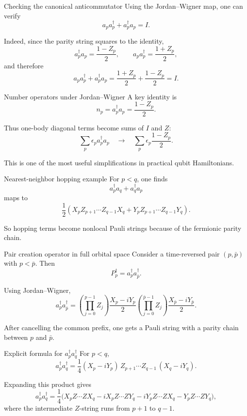 \documentclass[aspectratio=169]{beamer}
\begin{document}
\begin{frame}{Checking the canonical anticommutator}
Using the Jordan--Wigner map, one can verify
\[
a_p a_p^\dagger + a_p^\dagger a_p = I.
\]

Indeed, since the parity string squares to the identity,
\[
a_p^\dagger a_p
=
\frac{1-Z_p}{2},
\qquad
a_p a_p^\dagger
=
\frac{1+Z_p}{2},
\]
and therefore
\[
a_p a_p^\dagger + a_p^\dagger a_p
=
\frac{1+Z_p}{2}+\frac{1-Z_p}{2}=I.
\]
\end{frame}

\begin{frame}{Number operators under Jordan--Wigner}
A key identity is
\[
n_p = a_p^\dagger a_p = \frac{1-Z_p}{2}.
\]

Thus one-body diagonal terms become sums of \(I\) and \(Z\):
\[
\sum_p \epsilon_p a_p^\dagger a_p
\quad \longrightarrow \quad
\sum_p \epsilon_p \frac{1-Z_p}{2}.
\]

This is one of the most useful simplifications in practical qubit Hamiltonians.
\end{frame}

\begin{frame}{Nearest-neighbor hopping example}
For \(p<q\), one finds
\[
a_p^\dagger a_q + a_q^\dagger a_p
\]
maps to
\[
\frac12
\left(
X_p Z_{p+1}\cdots Z_{q-1} X_q
+
Y_p Z_{p+1}\cdots Z_{q-1} Y_q
\right).
\]

So hopping terms become nonlocal Pauli strings because of the fermionic parity chain.
\end{frame}

\begin{frame}{Pair creation operator in full orbital space}
Consider a time-reversed pair \((p,\bar p)\) with \(p<\bar p\).
Then
\[
P_p^\dagger = a_p^\dagger a_{\bar p}^\dagger.
\]

Using Jordan--Wigner,
\[
a_p^\dagger a_{\bar p}^\dagger
=
\left(\prod_{j=0}^{p-1} Z_j\right)\frac{X_p-iY_p}{2}
\left(\prod_{j=0}^{\bar p-1} Z_j\right)\frac{X_{\bar p}-iY_{\bar p}}{2}.
\]

After cancelling the common prefix, one gets a Pauli string with a parity chain between \(p\) and \(\bar p\).
\end{frame}

\begin{frame}{Explicit formula for \(a_p^\dagger a_q^\dagger\)}
For \(p<q\),
\[
a_p^\dagger a_q^\dagger
=
\frac14
(X_p-iY_p)\,
Z_{p+1}\cdots Z_{q-1}\,
(X_q-iY_q).
\]

Expanding this product gives
\[
a_p^\dagger a_q^\dagger
=
\frac14\Big(
X_p Z\cdots Z X_q
- i X_p Z\cdots Z Y_q
- i Y_p Z\cdots Z X_q
- Y_p Z\cdots Z Y_q
\Big),
\]
where the intermediate \(Z\)-string runs from \(p+1\) to \(q-1\).
\end{frame}
\end{document}
